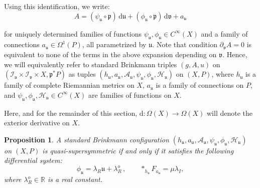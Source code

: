\documentclass[10pt,a4paper,twoside,reqno]{amsart}
\theoremstyle{plain}
\newtheorem{prop}[thm]{Proposition}
\theoremstyle{definition}
\theoremstyle{remark}
\def\dd{\mathrm{d}}
\def\cH{\mathcal{H}}
\def\cA{\mathcal{A}}
\def\cI{\mathcal{I}}
\def\cH{\mathcal{H}}
\def\dd{\mathrm{d}}
\def\fru{\mathfrak{u}}
\def\frv{\mathfrak{v}}
\begin{document}
\noindent
Using this identification, we write:
\begin{equation}
\label{eq:Aexpansion}
A = (\psi_{\fru}\circ \mathfrak{p})\, \dd \fru + (\phi_{\fru}\circ \mathfrak{p}) \, \dd \frv + a_{\fru}
\end{equation}

\noindent
for uniquely determined families of functions $\psi_{\fru}, \phi_{\fru}\in C^{\infty}(X)$ and a family of connections $a_{\fru} \in \Omega^1(P)$, all parametrized by $\fru$. Note that condition $\partial_{\frv} A = 0$ is equivalent to none of the terms in the above expansion depending on $\frv$. Hence, we will equivalently refer to standard Brinkmann triples $(g,A,u)$ on $(\cI_{\fru}\times\cI_{\frv} \times X, \mathfrak{p}^{\ast}P)$ as tuples $(h_{\fru}, a_{\fru}, \cA_{\fru}, \psi_{\fru}, \phi_{\fru}, \cH_{\fru})$ on $(X,P)$, where $h_{\fru}$ is a family of complete Riemannian metrics on $X$, $a_{\fru}$ is a family of connections on $P$, and $\psi_{\fru},\phi_{\fru},\cH_{\fru}\in C^{\infty}(X)$ are families of functions on $X$. \medskip

Here, and for the remainder of this section, $\dd \colon \Omega(X) \to \Omega(X)$ will denote the exterior derivative on $X$.

\begin{prop}
\label{prop:brinkmannsusy}
A standard Brinkmann configuration $(h_{\fru}, a_{\fru}, \cA_{\fru}, \psi_{\fru}, \phi_{\fru}, \cH_{\fru})$ on $(X,P)$ is quasi-supersymmetric if and only if it satisfies the following differential system:
\begin{equation*}
\phi_{\fru} = \lambda_R \fru + \lambda_R^o \, , \qquad \ast_{h_{\fru}} F_{a_{\fru}} = \mu \lambda_I,
\end{equation*}
where $\lambda_R^o\in \mathbb{R}$ is a real constant.
\end{prop}
\end{document}
